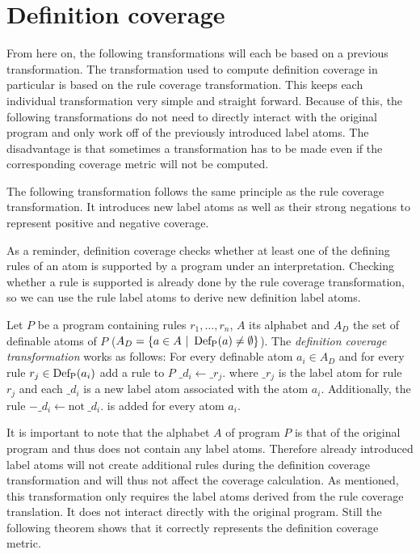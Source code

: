 \section{Definition coverage}
\label{sec:Computing coverage metrics for propositional programs/Definition coverage}
From here on, the following transformations will each be based on a previous transformation. The transformation used to compute definition coverage in particular is based on the rule coverage transformation. This keeps each individual transformation very simple and straight forward. Because of this, the following transformations do not need to directly interact with the original program and only work off of the previously introduced label atoms. The disadvantage is that sometimes a transformation has to be made even if the corresponding coverage metric will not be computed. 

The following transformation follows the same principle as the rule coverage transformation. It introduces new label atoms as well as their strong negations to represent positive and negative coverage.

As a reminder, definition coverage checks whether at least one of the defining rules of an atom is supported by a program under an interpretation. Checking whether a rule is supported is already done by the rule coverage transformation, so we can use the rule label atoms to derive new definition label atoms.

\begin{definition}
\label{def:definition transformation}
    Let $P$ be a program containing rules \(r_1, \ldots, r_n\), $A$ its alphabet and $A_D$ the set of definable atoms of $P$ (\(A_D = \{a \in A\ |\ \operatorname{Def_P}(a) \neq \emptyset\}\)). The \emph{definition coverage transformation} works as follows: For every definable atom \(a_i \in A_D\) and for every rule \(r_j \in \operatorname{Def_P}(a_i)\) add a rule to $P$ \(\_d_i \leftarrow \_r_j.\) where $\_r_j$ is the label atom for rule $r_j$ and each $\_d_i$ is a new label atom associated with the atom $a_i$. Additionally, the rule \(-\_d_i \leftarrow \text{not}\ \_d_i.\) is added for every atom $a_i$.
\end{definition}

It is important to note that the alphabet $A$ of program $P$ is that of the original program and thus does not contain any label atoms. Therefore already introduced label atoms will not create additional rules during the definition coverage transformation and will thus not affect the coverage calculation.
As mentioned, this transformation only requires the label atoms derived from the rule coverage translation. It does not interact directly with the original program. Still the following theorem shows that it correctly represents the definition coverage metric. 

